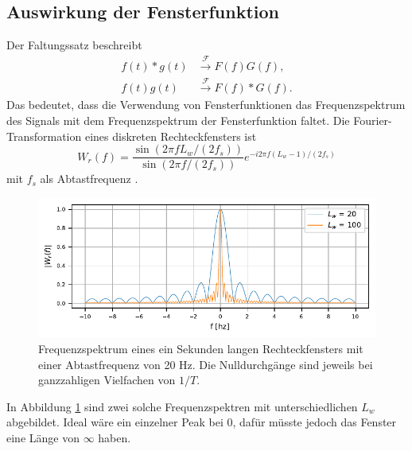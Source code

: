 \subsection{Auswirkung der Fensterfunktion}
Der Faltungssatz beschreibt 
\begin{align}
    f(t) * g(t)& \xrightarrow{\mathscr{F}} F(f)G(f),\\
    f(t) g(t)&\xrightarrow{\mathscr{F}}F(f) * G(f).
\end{align}
Das bedeutet, dass die Verwendung von Fensterfunktionen das Frequenzspektrum
des Signals mit dem Frequenzspektrum der Fensterfunktion faltet.
Die Fourier-Transformation eines diskreten Rechteckfensters ist 
\begin{equation}
    W_r(f) = \frac{\sin(2 \pi f  L_w / (2 f_s))}{\sin(2 \pi f / (2 f_s))} e^{-i 2 \pi f (L_w-1)/(2f_s)}
\end{equation}
mit $f_s$ als Abtastfrequenz \cite{sonogramm:digsig}.
\begin{figure}
    \centering
    \includegraphics{papers/sonogramm/images/rect_freq.pdf}
    \caption{Frequenzspektrum eines ein Sekunden langen Rechteckfensters mit einer Abtastfrequenz von 20 Hz. Die Nulldurchgänge sind jeweils bei ganzzahligen Vielfachen
    von $1/T$.
    \label{sonogramm:rectfreq}
    }
\end{figure}
In Abbildung \ref{sonogramm:rectfreq} sind zwei solche Frequenzspektren mit unterschiedlichen $L_w$ abgebildet.
Ideal wäre ein einzelner Peak bei 0, dafür müsste jedoch das Fenster eine Länge von $\infty$ haben.

